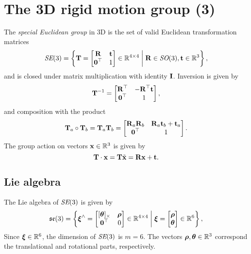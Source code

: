 \section{The 3D rigid motion group \SE(3)} \label{sec:SE3_group}
The \emph{special Euclidean group} in 3D is the set of valid Euclidean transformation matrices
\begin{equation}
  \SE(3) = \left \{ \matT =
  \begin{bmatrix}
    \matR & \vect\\
    \matr{0}\trans & 1
  \end{bmatrix}
  \in \bbR^{4 \times 4} \;\middle|\; \matR \in \SO(3), \vect \in \bbR^3 \right \},
\end{equation}
and is closed under matrix multiplication with identity $\matI$.
Inversion is given by
\begin{equation}
  \matT^{-1} = 
  \begin{bmatrix}
    \matR\trans & -\matR\trans \vect\\
    \matr{0}\trans & 1
  \end{bmatrix},
\end{equation}
and composition with the product
\begin{equation}
  \matT_a \circ \matT_b = \matT_a \matT_b = 
  \begin{bmatrix}
    \matR_a \matR_b & \matR_a \vect_b + \vect_a\\
    \matr{0}\trans & 1
  \end{bmatrix}.
\end{equation}
The group action on vectors $\vecx \in \bbR^3$ is given by
\begin{equation} \label{eq:SE3-group-action}
  \matT \cdot \vecx = \matT \tilde{\vecx} = \matR \vecx + \vect.
\end{equation}


\subsection{Lie algebra}
The Lie algebra of $\SE(3)$ is given by
\begin{equation}
  \se(3) = \left \{ \vecxi^\wedge = 
  \begin{bmatrix}
    [\vectheta]_\times & \vecrho\\
    \matr{0}\trans & 0
  \end{bmatrix}
  \in \bbR^{4 \times 4} \;\middle|\; \vecxi =
  \begin{bmatrix}
    \vecrho\\
    \vectheta
  \end{bmatrix}  
  \in \bbR^6 \right \},
\end{equation}
Since $\vecxi \in \bbR^6$, the dimension of $\SE(3)$ is $m = 6$.
The vectors $\vecrho, \vectheta \in \bbR^3$ correspond the translational and rotational parts, respectively.

